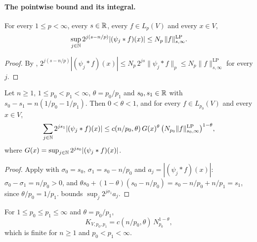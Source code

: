 \paragraph{The pointwise bound and its integral.}

\begin{lemma}
\label{lem:nikolskii-sup}
\leanok
{}
For every $1 \leq p < \infty$, every $s \in \mathbb{R}$, every $f \in L_p(V)$ and every $x \in V$,
\[
  \sup_{j \in \mathbb{N}} 2^{j(s - n/p)} |(\psi_j * f)(x)| \leq N_p \, \|f\|^{\mathrm{LP}}_{s,\infty} .
\]
\end{lemma}

\begin{proof}
\leanok
By ,
$2^{j(s - n/p)} |(\psi_j * f)(x)| \leq N_p \, 2^{js} \|\psi_j * f\|_p
\leq N_p \|f\|^{\mathrm{LP}}_{s,\infty}$ for every $j$.
\end{proof}

\begin{lemma}
\label{lem:critical-pointwise-bound}
\leanok
{}
Let $n \geq 1$, $1 \leq p_0 < p_1 < \infty$, $\theta = p_0/p_1$ and $s_0, s_1 \in \mathbb{R}$ with
$s_0 - s_1 = n(1/p_0 - 1/p_1)$. Then $0 < \theta < 1$, and for every $f \in L_{p_0}(V)$ and every
$x \in V$,
\[
  \sum_{j \in \mathbb{N}} 2^{j s_1} |(\psi_j * f)(x)|
  \leq c(n/p_0, \theta) \, G(x)^\theta \,
    \bigl(N_{p_0} \|f\|^{\mathrm{LP}}_{s_0,\infty}\bigr)^{1-\theta} ,
\]
where $G(x) = \sup_{j \in \mathbb{N}} 2^{j s_0} |(\psi_j * f)(x)|$.
\end{lemma}

\begin{proof}
\leanok
Apply  with $\sigma_0 = s_0$, $\sigma_1 = s_0 - n/p_0$ and
$a_j = |(\psi_j * f)(x)|$: $\sigma_0 - \sigma_1 = n/p_0 > 0$, and
$\theta s_0 + (1 - \theta)(s_0 - n/p_0) = s_0 - n/p_0 + n/p_1 = s_1$, since $\theta/p_0 = 1/p_1$.
 bounds $\sup_j 2^{j\sigma_1} a_j$.
\end{proof}

\begin{definition}
\label{def:critical-embedding-const}
\leanok
{}
For $1 \leq p_0 \leq p_1 \leq \infty$ and $\theta = p_0/p_1$,
\[
  K_{V,p_0,p_1} = c(n/p_0, \theta) \, N_{p_0}^{1-\theta} ,
\]
which is finite for $n \geq 1$ and $p_0 < p_1 < \infty$.
\end{definition}

